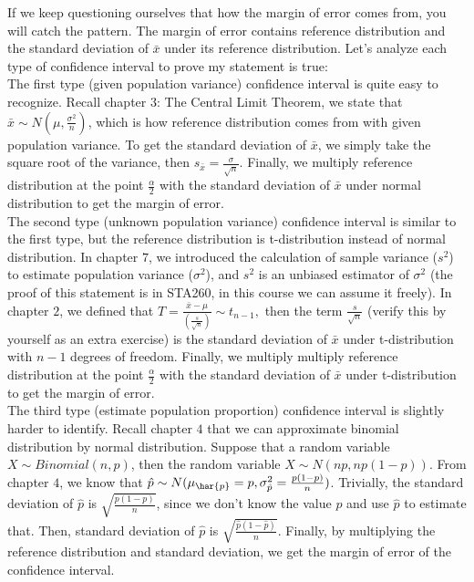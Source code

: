 \noindent
If we keep questioning ourselves that how the margin of error comes from, you will catch the pattern. The margin of error contains reference distribution and the standard deviation of $\bar{x}$ under its reference distribution. Let's analyze each type of confidence interval to prove my statement is true:\\

\noindent
The first type (given population variance) confidence interval is quite easy to recognize. Recall chapter $3$: The Central Limit Theorem, we state that $\bar{x} \sim N(\mu, \frac{\sigma^2}{n})$, which is how reference distribution comes from with given population variance. To get the standard deviation of $\bar{x}$, we simply take the square root of the variance, then $s_{\bar{x}} = \frac{\sigma}{\sqrt{n}}$. Finally, we multiply reference distribution at the point $\frac{\alpha}{2}$ with the standard deviation of $\bar{x}$ under normal distribution to get the margin of error.\\

\noindent
The second type (unknown population variance) confidence interval is similar to the first type, but the reference distribution is t-distribution instead of normal distribution. In chapter $7$, we introduced the calculation of sample variance ($s^2$) to estimate population variance ($\sigma^2$), and $s^2$ is an unbiased estimator of $\sigma^2$ (the proof of this statement is in STA260, in this course we can assume it freely). In chapter $2$, we defined that $T = \frac{\bar{x} - \mu}{(\frac{s}{\sqrt{n}})} \sim t_{n-1},$ then the term $\frac{s}{\sqrt{n}}$ (verify this by yourself as an extra exercise) is the standard deviation of $\bar{x}$ under t-distribution with $n-1$ degrees of freedom. Finally, we multiply multiply reference distribution at the point $\frac{\alpha}{2}$ with the standard deviation of $\bar{x}$ under t-distribution to get the margin of error.\\

\noindent
The third type (estimate population proportion) confidence interval is slightly harder to identify. Recall chapter $4$ that we can approximate binomial distribution by normal distribution. Suppose that a random variable $X \sim Binomial(n,p)$, then the random variable $X \sim N(np, np(1-p)).$ From chapter $4$, we know that $\hat{p} \sim N(\mu_{\har{p}} = p, \sigma_{\hat{p}}^{2} = \frac{p(1-p)}{n})$. Trivially, the standard deviation of $\hat{p}$ is $\sqrt{\frac{p(1-p)}{n}}$, since we don't know the value $p$ and use $\hat{p}$ to estimate that. Then, standard deviation of $\hat{p}$ is $\sqrt{\frac{\hat{p}(1-\hat{p})}{n}}$. Finally, by multiplying the reference distribution and standard deviation, we get the margin of error of the confidence interval.\\

